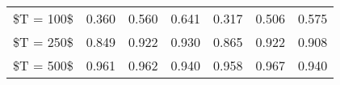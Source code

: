 % 
\begin{tabular}{ccccccc}
  \hline
  \hline
\$T = 100\$ & 0.360 & 0.560 & 0.641 & 0.317 & 0.506 & 0.575 \\ 
  \$T = 250\$ & 0.849 & 0.922 & 0.930 & 0.865 & 0.922 & 0.908 \\ 
  \$T = 500\$ & 0.961 & 0.962 & 0.940 & 0.958 & 0.967 & 0.940 \\ 
   \hline
\end{tabular}
